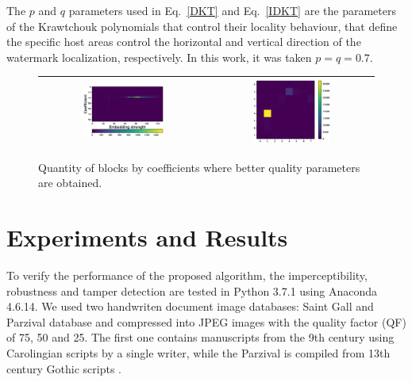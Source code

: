 \documentclass[runningheads]{llncs}
\begin{document}
The $p$ and $q$ parameters used in Eq.~\ref{DKT} and Eq.~\ref{IDKT} are the parameters of the Krawtchouk polynomials that control their locality behaviour, that define the specific host areas control the horizontal and vertical direction of the watermark localization, respectively. In this work, it was taken $p=q=0.7$.
\begin{figure}[H]
	\begin{center}
		\begin{tabular}{|c|c|}\hline
			\includegraphics[width=0.5\textwidth]{colormapDKT.eps}
			&\includegraphics[width=0.5\textwidth]{coefDKT.eps}\\\hline
		\end{tabular}
	\end{center}
	\caption{Quantity of blocks by coefficients where better quality parameters are obtained.}
	\label{colormapDKT}
\end{figure}

\section{Experiments and Results}
To verify the performance of the proposed algorithm, the imperceptibility, robustness and tamper detection are tested in Python 3.7.1 using Anaconda 4.6.14. We used two handwriten document image databases: Saint Gall \cite{fischer2011transcription} and Parzival \cite{fischer2009automatic} database and compressed into JPEG images with the
quality factor (QF) of 75, 50 and 25. The first one contains manuscripts from the 9th century using Carolingian scripts by a single writer, while the Parzival is compiled from 13th century Gothic scripts \cite{pastor2016complete}.
\end{document}
